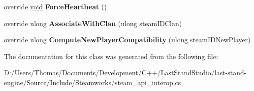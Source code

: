 \begin{DoxyCompactItemize}
\item 
\hypertarget{classValve_1_1Steamworks_1_1CSteamGameServer_a4183c8919e246b29541470e88a3e1117}{}override \hyperlink{SDL__audio_8h_a52835ae37c4bb905b903cbaf5d04b05f}{void} {\bfseries Force\+Heartbeat} ()\label{classValve_1_1Steamworks_1_1CSteamGameServer_a4183c8919e246b29541470e88a3e1117}

\item 
\hypertarget{classValve_1_1Steamworks_1_1CSteamGameServer_a221dc55eae3321c5dce3cef614f174c5}{}override ulong {\bfseries Associate\+With\+Clan} (ulong steam\+I\+D\+Clan)\label{classValve_1_1Steamworks_1_1CSteamGameServer_a221dc55eae3321c5dce3cef614f174c5}

\item 
\hypertarget{classValve_1_1Steamworks_1_1CSteamGameServer_a0155925cdad041b7cdd34e45d3433c30}{}override ulong {\bfseries Compute\+New\+Player\+Compatibility} (ulong steam\+I\+D\+New\+Player)\label{classValve_1_1Steamworks_1_1CSteamGameServer_a0155925cdad041b7cdd34e45d3433c30}

\end{DoxyCompactItemize}


The documentation for this class was generated from the following file\+:\begin{DoxyCompactItemize}
\item 
D\+:/\+Users/\+Thomas/\+Documents/\+Development/\+C++/\+Last\+Stand\+Studio/last-\/stand-\/engine/\+Source/\+Include/\+Steamworks/steam\+\_\+api\+\_\+interop.\+cs\end{DoxyCompactItemize}
